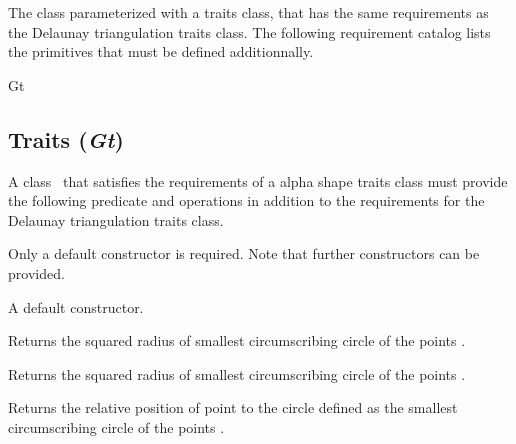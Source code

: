 The class  parameterized with a
traits class, that has the same requirements as the Delaunay
triangulation traits class.  The following requirement catalog lists
the primitives that must be defined additionnally.

\begin{ccClass} {Gt}
\subsection*{Traits (\mbox{\it Gt})}


\ccDefinition
A class \ccClassName\ that satisfies the requirements of a alpha shape
traits class must provide the following predicate and operations in
addition to the requirements for the Delaunay triangulation traits
class.

\ccTypes


\ccCreation

Only a default constructor is required. Note that further constructors
can be provided. 

{A default constructor.}


\ccOperations

{Returns the squared radius of smallest circumscribing circle of the
points . }

{Returns the squared radius of smallest circumscribing circle of the
points . }

{Returns the relative position of point  to the circle
defined as the smallest circumscribing circle of the points .}

\end{ccClass}

